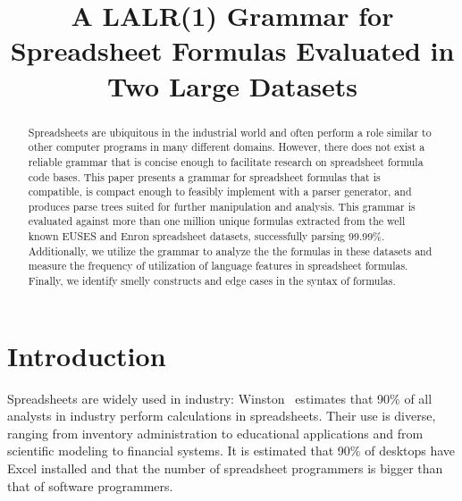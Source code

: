 \documentclass[conference]{IEEEtran}
\begin{document}
\title{A LALR(1) Grammar for Spreadsheet Formulas Evaluated in Two Large Datasets}

\author{
}
\maketitle

\begin{abstract}
Spreadsheets are ubiquitous in the industrial world and often perform a role similar to other computer programs in many different domains.
However, there does not exist a reliable grammar that is concise enough to facilitate research on spreadsheet formula code bases.
This paper presents a grammar for spreadsheet formulas that is compatible, is compact enough to feasibly implement with a parser generator, and produces parse trees suited for further manipulation and analysis. 
This grammar is evaluated against more than one million unique formulas extracted from the well known EUSES and Enron spreadsheet datasets, successfully parsing 99.99\%.
Additionally, we utilize the grammar to analyze the the formulas in these datasets and measure the frequency of utilization of language features in spreadsheet formulas.
Finally, we identify smelly constructs and edge cases in the syntax of formulas.
\end{abstract}

\IEEEpeerreviewmaketitle

\section{Introduction}
Spreadsheets are widely used in industry: Winston~\cite{Wins2001} estimates that 90\% of all analysts in industry perform calculations in
spreadsheets. Their use is diverse, ranging from inventory administration to educational applications and from scientific
modeling to financial systems. It is estimated that 90\% of desktops have Excel installed\cite{DBLP:conf/icse/BradleyM09} and that the number of spreadsheet programmers is bigger than that of software programmers\cite{DBLP:conf/vl/ScaffidiSM05}. 
\end{document}
